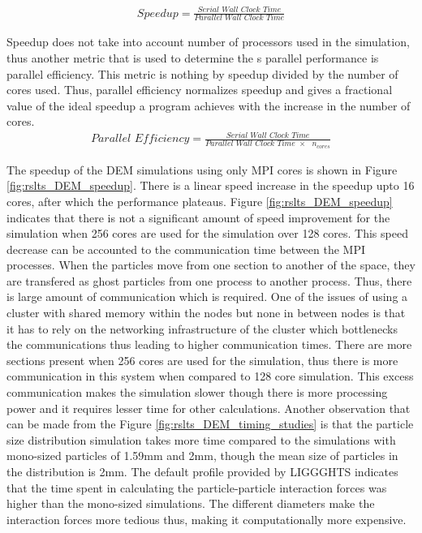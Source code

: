 \documentclass[preprint,11pt,authoryear]{elsarticle}
\begin{document}
\begin{align}
\textit{Speedup} = \frac{\textit{Serial Wall Clock Time}}{\textit{Parallel Wall Clock Time}}
\label{eqn:rslts_DEM_Speed_Up}
\end{align}

Speedup does not take into account number of processors used in the simulation, thus another metric 
that is used to determine the s parallel performance is parallel efficiency. This metric is nothing by 
speedup divided by the number of cores used. Thus, parallel efficiency normalizes speedup and gives 
a fractional value of the ideal speedup a program achieves with the increase in the number of cores.\\

\begin{align}
\textit{Parallel Efficiency} = \frac{\textit{Serial Wall Clock Time}}{\textit{Parallel Wall Clock Time $\times$ $n_{cores}$}}
\label{eqn:rslts_DEM_parallel_efficiency}
\end{align}

The speedup of the DEM simulations using only MPI cores is shown in Figure \ref{fig:rslts_DEM_speedup}.
There is a linear speed increase in the speedup upto 16 cores, after which the performance plateaus.
Figure \ref{fig:rslts_DEM_speedup} indicates that there 
is not a significant amount of speed improvement for the simulation when 256 cores are used for the 
simulation over 128 cores. This speed decrease can be accounted to the communication time between 
the MPI processes. When the particles move from one section to another of the space, they are 
transfered as ghost particles from one process to another process. Thus, there is large amount of 
communication which is required. One of the issues of using a cluster with shared memory within 
the nodes but none in between nodes is that it has to rely on the networking infrastructure 
of the cluster which bottlenecks the communications thus leading to higher communication times. 
There are more sections present when 256 cores are used for the 
simulation, thus there is more communication in this system when compared to 128 core simulation. 
This excess communication makes the simulation slower though there is more processing power and 
it requires lesser time for other calculations. Another observation that can be made from the Figure 
\ref{fig:rslts_DEM_timing_studies} is that the particle size distribution simulation takes more time 
compared to the simulations with mono-sized particles of 1.59mm and 2mm, though the mean size of 
particles in the distribution is 2mm. The default profile provided by LIGGGHTS indicates that the time 
spent in calculating the particle-particle interaction forces was higher than the mono-sized 
simulations. The different diameters make the interaction forces more tedious thus, making it 
computationally more expensive. 
\end{document}
